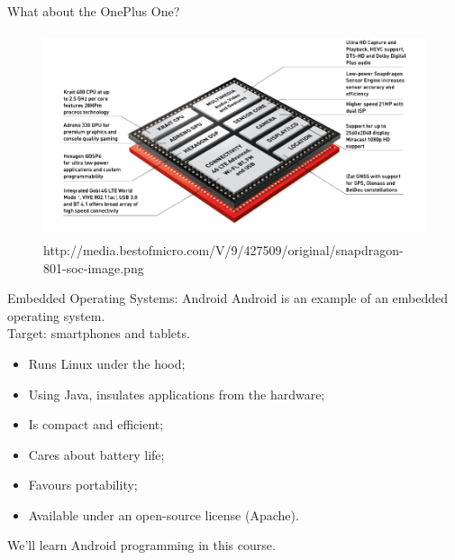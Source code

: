 \documentclass[aspectratio=169]{beamer}
\begin{document}
\begin{frame}{What about the OnePlus One?}
\begin{figure}[b]
\centering
\includegraphics[width=\textwidth,height=6cm,keepaspectratio]{img/snapdragon-801-soc-image.png}
\captionsetup{labelformat=empty,font=scriptsize}
\caption{http://media.bestofmicro.com/V/9/427509/original/snapdragon-801-soc-image.png}
\end{figure}
\end{frame}



\begin{frame}{Embedded Operating Systems: Android}
Android is an example of an \alert{embedded operating system}.\\[1em]
Target: smartphones and tablets.
\begin{itemize}
\item Runs Linux under the hood;
\item Using Java, insulates applications from the hardware;
\item Is compact and efficient;
\item Cares about battery life;
\item Favours portability;
\item Available under an open-source license (Apache).
\end{itemize}
We'll learn Android programming in this course.
\end{frame}
\end{document}
